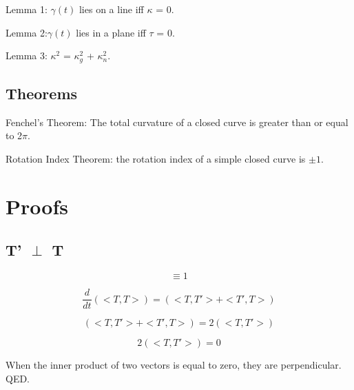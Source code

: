 \documentclass{article}
\begin{document}
 Lemma 1: $\gamma(t)$ lies on a line iff $\kappa$ = 0.
 
 Lemma 2:$\gamma(t)$ lies in a plane iff $\tau$ = 0.
 
 Lemma 3: $\kappa^2$ = $\kappa_{g}^2$ + $\kappa_{n}^2$.
 
 \subsection{Theorems}
 
 Fenchel's Theorem: The total curvature of a closed curve is greater than or equal to 2$\pi$.
 
 Rotation Index Theorem: the rotation index of a simple closed curve is $\pm 1$.

 
 
\section{Proofs}

\subsection{T' $\perp$ T}
 
 \[<T, T> \equiv 1 \]
 
 \[ \frac{d}{dt}(<T, T>) = (<T, T'> + <T', T>)\]
 
\[(<T, T'> + <T', T>) = 2(<T, T'>) \]

\[ 2(<T, T'>) = 0 \]

When the inner product of two vectors is equal to zero, they are perpendicular. QED.
\end{document}
